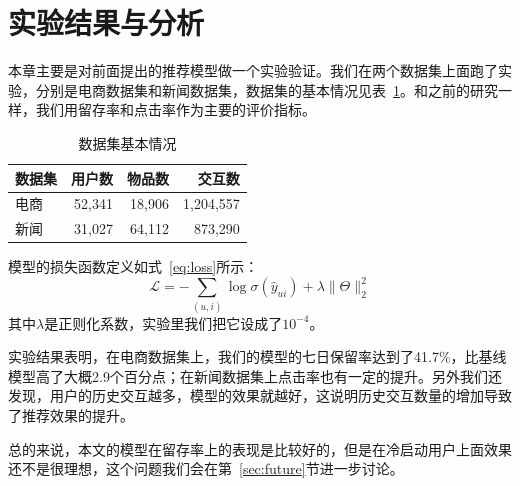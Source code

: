 \section{实验结果与分析}
\label{sec:results}

本章主要是对前面提出的推荐模型做一个实验验证。我们在两个数据集上面跑了实验，分别是电商数据集和新闻数据集，数据集的基本情况见表~\ref{tab:data}。和之前的研究\cite{li2021,chen2022}一样，我们用留存率和点击率作为主要的评价指标。

\begin{table}[htbp]
  \centering
  \caption{数据集基本情况}
  \label{tab:data}
  \begin{tabular}{lrrr}
    \hline
    数据集 & 用户数 & 物品数 & 交互数 \\
    \hline
    电商 & 52,341 & 18,906 & 1,204,557 \\
    新闻 & 31,027 & 64,112 & 873,290 \\
    \hline
  \end{tabular}
\end{table}

模型的损失函数定义如式~\eqref{eq:loss}所示：
\begin{equation}
  \mathcal{L} = -\sum_{(u,i)} \log \sigma(\hat{y}_{ui}) + \lambda \|\Theta\|_2^2
  \label{eq:loss}
\end{equation}
其中$\lambda$是正则化系数，实验里我们把它设成了$10^{-4}$。

实验结果表明，在电商数据集上，我们的模型的七日保留率达到了41.7\%，比基线模型高了大概2.9个百分点；在新闻数据集上点击率也有一定的提升。另外我们还发现，用户的历史交互越多，模型的效果就越好，这说明历史交互数量的增加导致了推荐效果的提升\cite{wang2020}。

总的来说，本文的模型在留存率上的表现是比较好的，但是在冷启动用户上面效果还不是很理想，这个问题我们会在第~\ref{sec:future}节进一步讨论。
